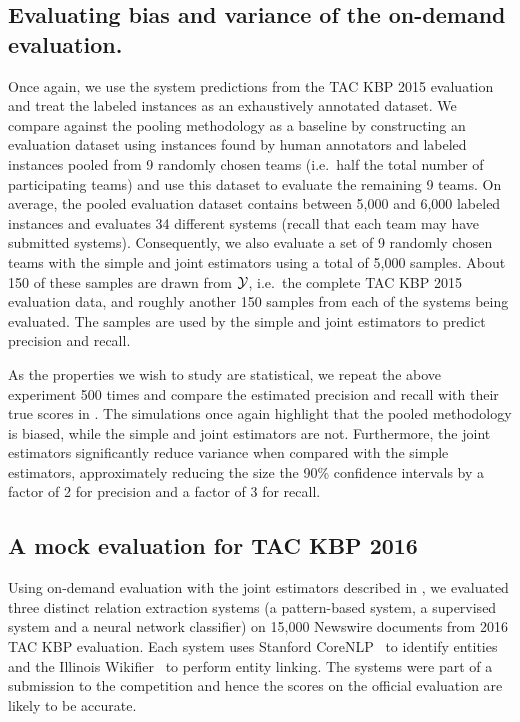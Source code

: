 \subsection{Evaluating bias and variance of the on-demand evaluation.}
Once again, we use the system predictions from the TAC KBP 2015 evaluation and treat the labeled instances as an exhaustively annotated dataset.
We compare against the pooling methodology as a baseline by constructing an evaluation dataset using instances found by human annotators and labeled instances pooled from 9 randomly chosen teams (i.e.\ half the total number of participating teams) and use this dataset to evaluate the remaining 9 teams.
On average, the pooled evaluation dataset contains between 5,000 and 6,000 labeled instances and evaluates 34 different systems (recall that each team may have submitted systems).
Consequently, we also evaluate a set of 9 randomly chosen teams with the simple and joint estimators using a total of 5,000 samples.
About 150 of these samples are drawn from $\mathcal{Y}$, i.e.\ the complete TAC KBP 2015 evaluation data, and roughly another 150 samples from each of the systems being evaluated.
The samples are used by the simple and joint estimators to predict precision and recall.

As the properties we wish to study are statistical, we repeat the above experiment 500 times and compare the estimated precision and recall with their true scores in .
The simulations once again highlight that the pooled methodology is biased, while the simple and joint estimators are not.
Furthermore, the joint estimators significantly reduce variance when compared with the simple estimators, 
approximately reducing the size the 90\% confidence intervals by a factor of 2 for precision and a factor of 3 for recall.

\subsection{A mock evaluation for TAC KBP 2016}
Using on-demand evaluation with the joint estimators described in , we evaluated three distinct relation extraction systems (a pattern-based system, a supervised system and a neural network classifier) on 15,000 Newswire documents from 2016 TAC KBP evaluation.
Each system uses Stanford CoreNLP~\citep{} to identify entities and the Illinois Wikifier~\citep{} to perform entity linking. 
The systems were part of a submission to the competition and hence the scores on the official evaluation are likely to be accurate.

